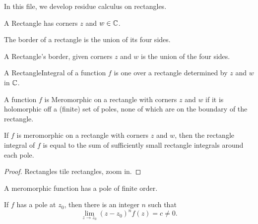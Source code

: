 

In this file, we develop residue calculus on rectangles.

\begin{definition}\label{Rectangle}\leanok
A Rectangle has corners $z$ and $w \in \C$.
\end{definition}



The border of a rectangle is the union of its four sides.
\begin{definition}\label{RectangleBorder}\leanok
A Rectangle's border, given corners $z$ and $w$ is the union of the four sides.
\end{definition}



\begin{definition}\label{RectangleIntegral}\leanok
A RectangleIntegral of a function $f$ is one over a rectangle determined by $z$ and $w$ in $\C$.
\end{definition}



\begin{definition}\label{MeromorphicOnRectangle}\leanok
A function $f$ is Meromorphic on a rectangle with corners $z$ and $w$ if it is holomorphic off a
(finite) set of poles, none of which are on the boundary of the rectangle.
\end{definition}



\begin{theorem}\label{RectangleIntegralEqSumOfRectangles}
If $f$ is meromorphic on a rectangle with corners $z$ and $w$, then the rectangle integral of $f$
is equal to the sum of sufficiently small rectangle integrals around each pole.
\end{theorem}



\begin{proof}
Rectangles tile rectangles, zoom in.
\end{proof}



A meromorphic function has a pole of finite order.
\begin{definition}\label{PoleOrder}
If $f$ has a pole at $z_0$, then there is an integer $n$ such that
$$
\lim_{z\to z_0} (z-z_0)^n f(z) = c \neq 0.
$$
\end{definition}

